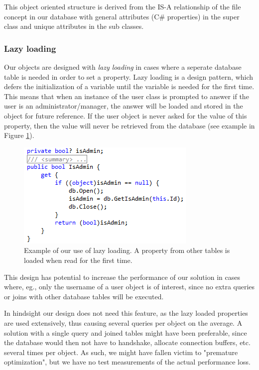 This object oriented structure is derived from the IS-A relationship of the file concept in our database with general attributes (C\# properties) in the super class and unique attributes in the sub classes.

\subsubsection{Lazy loading}

Our objects are designed with \emph{lazy loading} in cases where a seperate database table is needed in order to set a property. Lazy loading is a design pattern, which defers the initialization of a variable until the variable is needed for the first time. This means that when an instance of the user class is prompted to answer if the user is an administrator/manager, the answer will be loaded and stored in the object for future reference. If the user object is never asked for the value of this property, then the value will never be retrieved from the database (see example in Figure \ref{fig:lazyload}).

\begin{figure}[hbt]
	\centering
	\includegraphics[scale=0.8]{./p1design/lazyload.png}
	\caption{Example of our use of lazy loading. A property from other tables is loaded when read for the first time.}
	\label{fig:lazyload}
\end{figure}


This design has potential to increase the performance of our solution in cases where, eg., only the username of a user object is of interest, since no extra queries or joins with other database tables will be executed.

In hindsight our design does not need this feature, as the lazy loaded properties are used extensively, thus causing several queries per object on the average. A solution with a single query and joined tables might have been preferable, since the database would then not have to handshake, allocate connection buffers, etc. several times per object. As such, we might have fallen victim to "premature optimization"\cite{premoptim}, but we have no test measurements of the actual performance loss.


